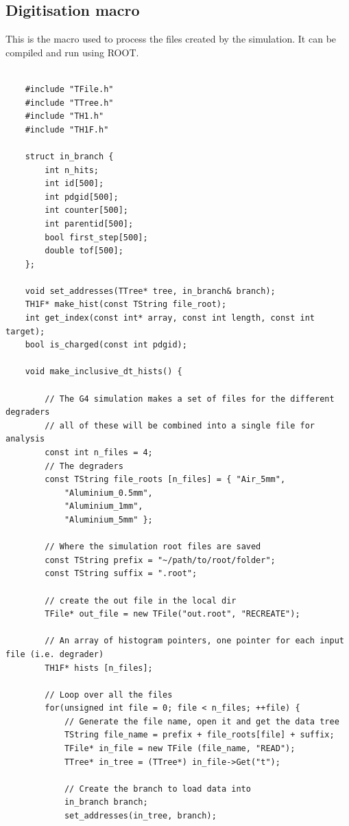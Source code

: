 \documentclass[]{article}
\begin{document}
\subsection{Digitisation macro} %
\label{appsub:digitisation_macro}
This is the macro used to process the files created by the simulation. It can be compiled and run using ROOT.
\begin{verbatim}
    
    #include "TFile.h"
    #include "TTree.h"
    #include "TH1.h"
    #include "TH1F.h"

    struct in_branch {
        int n_hits;
        int id[500];
        int pdgid[500];
        int counter[500];
        int parentid[500];
        bool first_step[500];
        double tof[500];
    };

    void set_addresses(TTree* tree, in_branch& branch);
    TH1F* make_hist(const TString file_root);
    int get_index(const int* array, const int length, const int target);
    bool is_charged(const int pdgid);

    void make_inclusive_dt_hists() {
        
        // The G4 simulation makes a set of files for the different degraders
        // all of these will be combined into a single file for analysis
        const int n_files = 4;
        // The degraders
        const TString file_roots [n_files] = { "Air_5mm",
            "Aluminium_0.5mm",
            "Aluminium_1mm",
            "Aluminium_5mm" };

        // Where the simulation root files are saved
        const TString prefix = "~/path/to/root/folder";
        const TString suffix = ".root";
        
        // create the out file in the local dir
        TFile* out_file = new TFile("out.root", "RECREATE");

        // An array of histogram pointers, one pointer for each input file (i.e. degrader)
        TH1F* hists [n_files];

        // Loop over all the files
        for(unsigned int file = 0; file < n_files; ++file) {
            // Generate the file name, open it and get the data tree
            TString file_name = prefix + file_roots[file] + suffix;
            TFile* in_file = new TFile (file_name, "READ");
            TTree* in_tree = (TTree*) in_file->Get("t");
            
            // Create the branch to load data into 
            in_branch branch; 
            set_addresses(in_tree, branch);
            

\end{verbatim}
\end{document}
